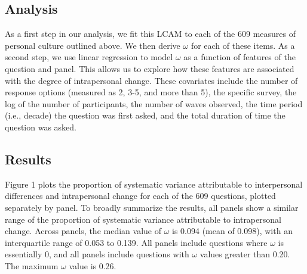 \documentclass[
  11pt,
]{article}
\begin{document}
\subsection{Analysis}\label{analysis}

As a first step in our analysis, we fit this LCAM to each of the 609
measures of personal culture outlined above. We then derive \(\omega\)
for each of these items. As a second step, we use linear regression to
model \(\omega\) as a function of features of the question and panel.
This allows us to explore how these features are associated with the
degree of intrapersonal change. These covariates include the number of
response options (measured as 2, 3-5, and more than 5), the specific
survey, the log of the number of participants, the number of waves
observed, the time period (i.e., decade) the question was first asked,
and the total duration of time the question was asked.

\subsection{Results}\label{results}

Figure 1 plots the proportion of systematic variance attributable to
interpersonal differences and intrapersonal change for each of the 609
questions, plotted separately by panel. To broadly summarize the
results, all panels show a similar range of the proportion of systematic
variance attributable to intrapersonal change. Across panels, the median
value of \(\omega\) is 0.094 (mean of 0.098), with an interquartile
range of 0.053 to 0.139. All panels include questions where \(\omega\)
is essentially 0, and all panels include questions with \(\omega\)
values greater than 0.20. The maximum \(\omega\) value is 0.26.
\end{document}
